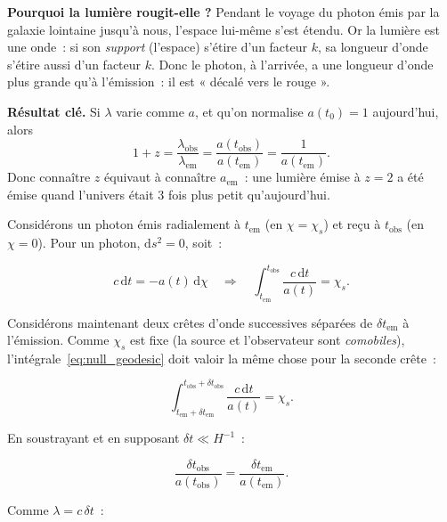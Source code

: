 \documentclass[11pt,a4paper,openany]{report}
\newcommand{\dif}{\mathrm{d}}
\begin{document}
\begin{tcolorbox}[vulgarisation]
\textbf{Pourquoi la lumière rougit-elle ?} Pendant le voyage du photon
émis par la galaxie lointaine jusqu'à nous, l'espace lui-même s'est étendu.
Or la lumière est une onde~: si son \emph{support} (l'espace) s'étire d'un
facteur $k$, sa longueur d'onde s'étire aussi d'un facteur $k$. Donc le
photon, à l'arrivée, a une longueur d'onde plus grande qu'à l'émission~: il
est « décalé vers le rouge ».
\end{tcolorbox}

\begin{tcolorbox}[mathspe]
\textbf{Résultat clé.} Si $\lambda$ varie comme $a$, et qu'on normalise
$a(t_0)=1$ aujourd'hui, alors
\[
1 + z = \frac{\lambda_{\text{obs}}}{\lambda_{\text{em}}}
       = \frac{a(t_{\text{obs}})}{a(t_{\text{em}})}
       = \frac{1}{a(t_{\text{em}})}.
\]
Donc connaître $z$ équivaut à connaître $a_{\text{em}}$~: une lumière émise
à $z=2$ a été émise quand l'univers était $3$ fois plus petit qu'aujourd'hui.
\end{tcolorbox}

Considérons un photon émis radialement à $t_{\text{em}}$ (en $\chi=\chi_s$) et reçu
à $t_{\text{obs}}$ (en $\chi=0$). Pour un photon, $\dif s^{2}=0$, soit~:

\begin{equation}
c\,\dif t = -a(t)\,\dif\chi
\quad\Longrightarrow\quad
\int_{t_{\text{em}}}^{t_{\text{obs}}} \frac{c\,\dif t}{a(t)} = \chi_{s}.
\label{eq:null_geodesic}
\end{equation}

Considérons maintenant deux crêtes d'onde successives séparées de $\delta t_{\text{em}}$
à l'émission. Comme $\chi_{s}$ est fixe (la source et l'observateur sont
\emph{comobiles}), l'intégrale~\eqref{eq:null_geodesic} doit valoir la même
chose pour la seconde crête~:

\begin{equation}
\int_{t_{\text{em}}+\delta t_{\text{em}}}^{t_{\text{obs}}+\delta t_{\text{obs}}}
   \frac{c\,\dif t}{a(t)} = \chi_{s}.
\end{equation}

En soustrayant et en supposant $\delta t \ll H^{-1}$~:

\begin{equation}
\frac{\delta t_{\text{obs}}}{a(t_{\text{obs}})}
= \frac{\delta t_{\text{em}}}{a(t_{\text{em}})}.
\label{eq:period_scaling}
\end{equation}

Comme $\lambda = c\,\delta t$~:
\end{document}
